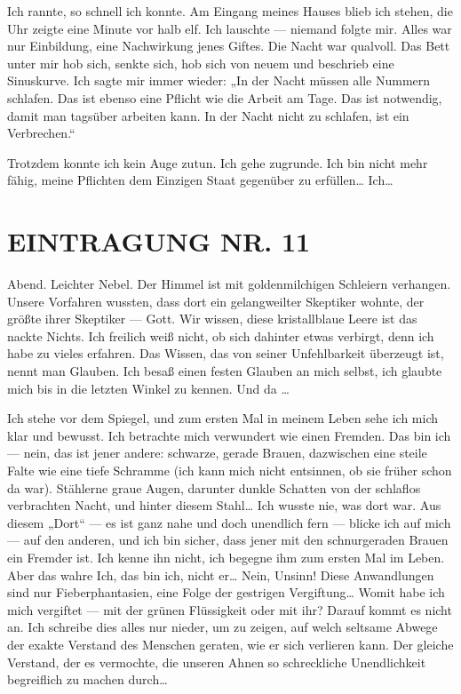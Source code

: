 Ich rannte, so schnell ich konnte. Am Eingang meines Hauses blieb
ich stehen, die Uhr zeigte eine Minute vor halb elf. Ich lauschte —
niemand folgte mir. Alles war nur Einbildung, eine Nachwirkung
jenes Giftes. Die Nacht war qualvoll. Das Bett unter mir hob sich,
senkte sich, hob sich von neuem und beschrieb eine Sinuskurve.
Ich sagte mir immer wieder: „In der Nacht müssen alle
Nummern schlafen. Das ist ebenso eine Pflicht wie die Arbeit am
Tage. Das ist notwendig, damit man tagsüber arbeiten kann. In der
Nacht nicht zu schlafen, ist ein Verbrechen.“

Trotzdem konnte ich kein Auge zutun. Ich gehe zugrunde. Ich bin
nicht mehr fähig, meine Pflichten dem Einzigen Staat gegenüber zu
erfüllen\ldots{} Ich\ldots{}

\section{EINTRAGUNG NR. 11}

Abend. Leichter Nebel. Der Himmel ist mit goldenmilchigen Schleiern
verhangen. Unsere Vorfahren wussten, dass dort ein gelangweilter
Skeptiker wohnte, der größte ihrer Skeptiker — Gott. Wir wissen,
diese kristallblaue Leere ist das nackte Nichts. Ich freilich weiß
nicht, ob sich dahinter etwas verbirgt, denn ich habe zu vieles
erfahren. Das Wissen, das von seiner Unfehlbarkeit überzeugt ist,
nennt man Glauben. Ich besaß einen festen Glauben an mich selbst,
ich glaubte mich bis in die letzten Winkel zu kennen. Und da \ldots{}

Ich stehe vor dem Spiegel, und zum ersten Mal in meinem Leben sehe
ich mich klar und bewusst. Ich betrachte mich verwundert wie einen
Fremden. Das bin ich — nein, das ist jener andere: schwarze, gerade
Brauen, dazwischen eine steile Falte wie eine tiefe Schramme (ich
kann mich nicht entsinnen, ob sie früher schon da war). Stählerne
graue Augen, darunter dunkle Schatten von der schlaflos verbrachten
Nacht, und hinter diesem Stahl\ldots{} Ich wusste nie, was dort war. Aus
diesem „Dort“ — es ist ganz
nahe und doch unendlich fern — blicke ich auf mich — auf den
anderen, und ich bin sicher, dass jener mit den schnurgeraden
Brauen ein Fremder ist. Ich kenne ihn nicht, ich begegne ihm zum
ersten Mal im Leben. Aber das wahre Ich, das bin ich, nicht er\ldots{}
Nein, Unsinn! Diese Anwandlungen sind nur Fieberphantasien, eine
Folge der gestrigen Vergiftung\ldots{} Womit habe ich mich vergiftet —
mit der grünen Flüssigkeit oder mit ihr? Darauf kommt es nicht an.
Ich schreibe dies alles nur nieder, um zu zeigen, auf welch
seltsame Abwege der exakte Verstand des Menschen geraten, wie er
sich verlieren kann. Der gleiche Verstand, der es vermochte, die
unseren Ahnen so schreckliche Unendlichkeit begreiflich zu machen
durch\ldots{}

